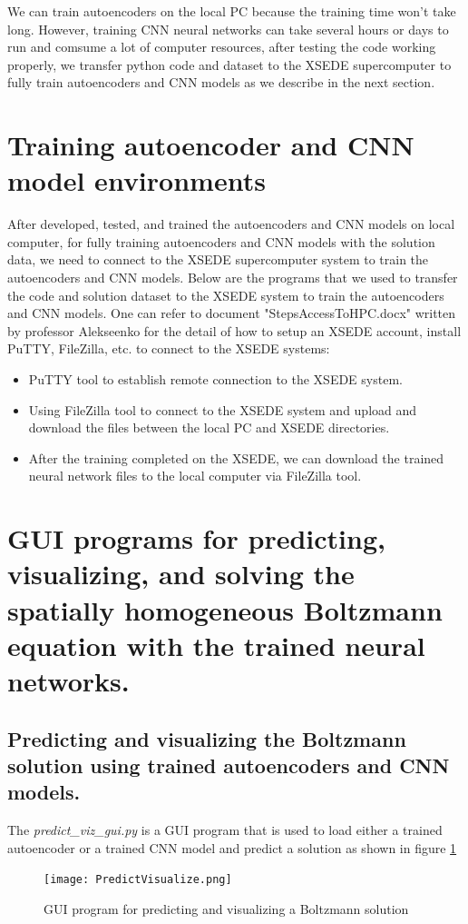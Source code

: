 \documentclass{article}
\begin{document}
We can train autoencoders on the local PC because the training time won't take long. However, training CNN neural networks can take several hours or days to run and comsume a lot of computer resources, after testing the code working properly, we transfer python code and dataset to the XSEDE supercomputer to fully train autoencoders and CNN models as we describe in the next section.

\section{Training autoencoder and CNN model environments} 
After developed, tested, and trained the autoencoders and CNN models on local computer, for fully training autoencoders and CNN models with the solution data, we need to connect to the XSEDE supercomputer system to train the autoencoders and CNN models. Below are the programs that we used to transfer the code and solution dataset to the XSEDE system to train the autoencoders and CNN models. One can refer to document "StepsAccessToHPC.docx" written by professor Alekseenko for the detail of how to setup an XSEDE account, install PuTTY, FileZilla, etc. to connect to the XSEDE systems:
\begin{itemize}
	\item PuTTY tool to establish remote connection to the XSEDE system.
	\item Using FileZilla tool to connect to the XSEDE system and upload and download the files between the local PC and XSEDE directories.
	\item After the training completed on the XSEDE, we can download the trained neural network files to the local computer via FileZilla tool.
\end{itemize}

\section{GUI programs for predicting, visualizing, and solving the spatially homogeneous Boltzmann equation with the trained neural networks.}
\subsection{Predicting and visualizing the Boltzmann solution using trained autoencoders and CNN models.}
The \emph{predict\_viz\_gui.py} is a GUI program that is used to load either a trained autoencoder or a trained CNN model and predict a solution as shown in figure \ref{fig:PredictVisualize}
\begin{figure}[h!]
	\centering
	\texttt{[image: PredictVisualize.png]}
	\caption{GUI program for predicting and visualizing a Boltzmann solution}
	\label{fig:PredictVisualize}
\end{figure}
\end{document}
